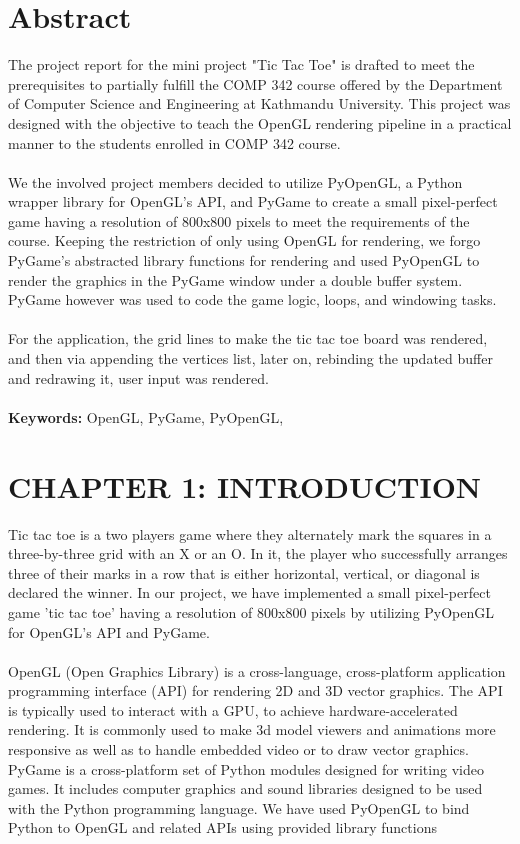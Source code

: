 \documentclass[12pt]{article}
\begin{document}
\section*{Abstract}
The project report for the mini project "Tic Tac Toe" is drafted to meet the prerequisites to partially fulfill
the COMP 342 course offered by the Department of Computer Science and Engineering at Kathmandu University.
This project was designed with the objective to teach the OpenGL rendering pipeline in a practical manner to the students enrolled in
COMP 342 course.\\\\
We the involved project members decided to utilize PyOpenGL, a Python wrapper library for OpenGL's API, and PyGame to create a small pixel-perfect game having a resolution of 800x800 pixels
to meet the requirements of the course. Keeping the restriction of only using OpenGL for rendering, we forgo PyGame's abstracted library functions
for rendering and used PyOpenGL to render the graphics in the PyGame window under a double buffer system.
PyGame however was used to code the game logic, loops, and windowing tasks.\\\\
For the application, the grid lines to make the tic tac toe board was rendered, and then via appending the vertices list, later on, rebinding the updated buffer and redrawing it, user input was rendered.\\\\
\textbf{Keywords: }OpenGL, PyGame, PyOpenGL,

\clearpage
\thispagestyle{empty}
\tableofcontents

\clearpage
\thispagestyle{empty}
\listoffigures

\clearpage
{}
\section{CHAPTER 1: INTRODUCTION}
Tic tac toe is a two players game where they alternately mark the squares in a three-by-three grid with an X or an O.
In it, the player who successfully arranges three of their marks in a row that is either horizontal, vertical, or diagonal
is declared the winner. In our project, we have implemented a small pixel-perfect game 'tic tac toe' having a resolution of
800x800 pixels by utilizing PyOpenGL for OpenGL’s API and PyGame. \\\\
OpenGL (Open Graphics Library) is a cross-language, cross-platform application programming interface (API) for rendering 2D
and 3D vector graphics. The API is typically used to interact with a GPU, to achieve hardware-accelerated rendering. It is
commonly used to make 3d model viewers and animations more responsive as well as to handle embedded video or to draw vector graphics.
PyGame is a cross-platform set of Python modules designed for writing video games. It includes computer graphics and sound libraries
designed to be used with the Python programming language.
We have used PyOpenGL to bind Python to OpenGL and related APIs using provided library functions
\end{document}
